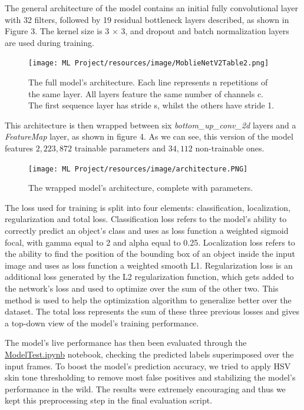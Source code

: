 \documentclass[a4paper, 12pt]{article}
\begin{document}
\begin{flushleft}
The general architecture of the model contains an initial fully convolutional layer with 32 filters, followed by 19 residual bottleneck layers described, as shown in Figure 3. The kernel size is 3 × 3, and dropout and batch normalization layers are used during training.

\begin{figure}[!h]
    \centering
    \texttt{[image: ML Project/resources/image/MoblieNetV2Table2.png]} \caption{The full model's architecture. Each line represents n repetitions of the same layer. All layers feature the same number of channels c. The first sequence layer has stride s, whilst the others have stride 1.}
\end{figure}
\label{figure3}

This architecture is then wrapped between six \textit{bottom\_up\_conv\_2d} layers and a \textit{FeatureMap} layer, as shown in figure 4.
As we can see, this version of the model features $2,223,872$ trainable parameters and $34,112$ non-trainable ones.\linebreak

\begin{figure}[!h]
    \centering
    \texttt{[image: ML Project/resources/image/architecture.PNG]} \caption{The wrapped model's architecture, complete with parameters.}
\end{figure}
\label{figure4}

The loss used for training is split into four elements: classification, localization, regularization and total loss.
Classification loss refers to the model's ability to correctly predict an object's class and uses as loss function a weighted sigmoid focal, with gamma equal to 2 and alpha equal to 0.25.
Localization loss refers to the ability to find the position of the bounding box of an object inside the input image and uses as loss function a weighted smooth L1.
Regularization loss is an additional loss generated by the L2 regularization function, which gets added to the network's loss and used to optimize over the sum of the other two. This method is used to help the optimization algorithm to generalize better over the dataset.
The total loss represents the sum of these three previous losses and gives a top-down view of the model's training performance.\linebreak

The model's live performance has then been evaluated through the \href{https://github.com/MarzioVallero/ML-Based-Blender-Gestural-Input-Interface/blob/master/ModelTest.ipynb}{ModelTest.ipynb} notebook, checking the predicted labels superimposed over the input frames.\linebreak
To boost the model's prediction accuracy, we tried to apply HSV skin tone thresholding to remove most false positives and stabilizing the model's performance in the wild. The results were extremely encouraging and thus we kept this preprocessing step in the final evaluation script.

\end{flushleft}
\end{document}
